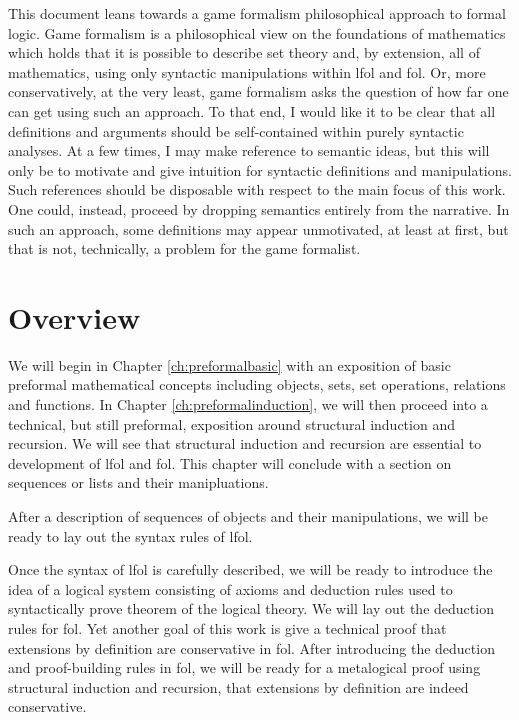 \documentclass[oneside, 12pt]{book}
\theoremstyle{break}
\newtheorem{preformal definition}[definition]{Preformal Definition}
\newtheorem{preformal theorem}[theorem]{Preformal Theorem}
\begin{document}
			This document leans towards a game formalism philosophical approach to formal logic.
			Game formalism is a philosophical view on the foundations of mathematics which holds that it is possible to describe set theory and, by extension, all of mathematics, using only syntactic manipulations within \gls{lfol} and \gls{fol}.
			Or, more conservatively, at the very least, game formalism asks the question of how far one can get using such an approach.
			To that end, I would like it to be clear that all definitions and arguments should be self-contained within purely syntactic analyses.
			At a few times, I may make reference to semantic ideas, but this will only be to motivate and give intuition for syntactic definitions and manipulations.
			Such references should be disposable with respect to the main focus of this work.
			One could, instead, proceed by dropping semantics entirely from the narrative.
			In such an approach, some definitions may appear unmotivated, at least at first, but that is not, technically, a problem for the game formalist.
			
		\section{Overview}
	
			We will begin in Chapter \ref{ch:preformalbasic} with an exposition of basic preformal mathematical concepts including objects, sets, set operations, relations and functions.
			In Chapter \ref{ch:preformalinduction}, we will then proceed into a technical, but still preformal, exposition around structural induction and recursion.
			We will see that structural induction and recursion are essential to development of \gls{lfol} and \gls{fol}.
			This chapter will conclude with a section on sequences or lists and their manipluations.
			
			
			
			After a description of sequences of objects and their manipulations, we will be ready to lay out the syntax rules of \gls{lfol}.			
			
			Once the syntax of \gls{lfol} is carefully described, we will be ready to introduce the idea of a logical system consisting of axioms and deduction rules used to syntactically prove theorem of the logical theory.
			We will lay out the deduction rules for \gls{fol}.
			Yet another goal of this work is give a technical proof that extensions by definition are conservative in \gls{fol}. 
			After introducing the deduction and proof-building rules in \gls{fol}, we will be ready for a metalogical proof using structural induction and recursion, that extensions by definition are indeed conservative.
			
\end{document}
